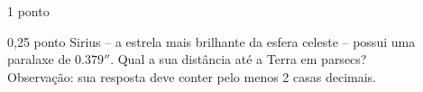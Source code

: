\documentclass{../lista}
\begin{document}
\begin{questao}{1 ponto}
		\begin{pergunta}{0,25 ponto}
			Sirius -- a estrela mais brilhante da esfera celeste -- possui uma paralaxe de $0.379''$. Qual a sua distância até a Terra em parsecs? \\
			Observação: sua resposta deve conter pelo menos 2 casas decimais.


		\end{pergunta}
	\end{questao}
\end{document}
